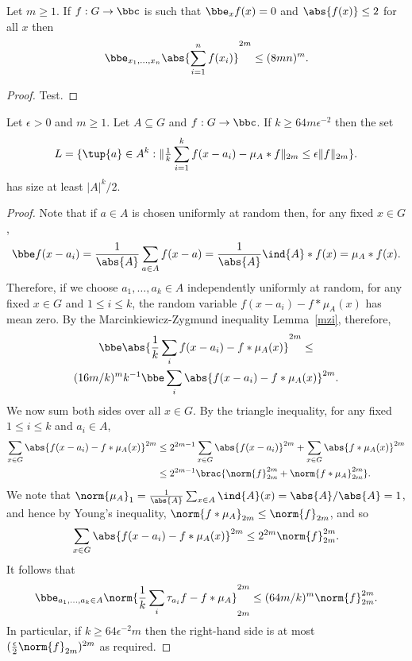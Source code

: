 \begin{lemma}
\label{mzi_complex}
\leanok
{}
Let $m\geq 1$. If $f:G\to\bbc$ is such that $\bbe_x f(x)=0$ and $\abs{f(x)}\leq 2$ for all $x$ then
\[\bbe_{x_1,\ldots,x_n} \abs{\sum_{i=1}^n f(x_i)}^{2m} \leq (8mn)^{m}.\]
\end{lemma}

\begin{proof}
\leanok
Test.
\end{proof}


\begin{lemma}
  \label{random_approx_expect}
  \leanok

  Let $\epsilon>0$ and $m\geq 1$. Let $A\subseteq G$ and $f:G\to \bbc$.
  If $k\geq 64m\epsilon^{-2}$ then the set
  \[
    L = \{\tup{a}\in A^k : \|\tfrac{1}{k}\sum_{i=1}^k f(x-a_i)-\mu_A\ast f\|_{2m}
      \le \epsilon \| f\|_{2m}\}.
  \]
  has size at least $\lvert A \rvert^k/2$.
\end{lemma}

\begin{proof}
\leanok
Note that if $a\in A$ is chosen uniformly at random then, for any fixed $x\in G$,
\[\bbe f(x-a_i)= \frac{1}{\abs{A}}\sum_{a\in A}f(x-a)=\frac{1}{\abs{A}}\ind{A}\ast f(x)=\mu_A\ast f(x).\]
Therefore, if we choose $a_1,\ldots,a_k\in A$ independently uniformly at random, for any fixed $x\in G$ and $1\leq i\leq k$,  the random variable $f(x-a_i)-f\ast \mu_A(x)$ has mean zero. By the Marcinkiewicz-Zygmund inequality Lemma~\ref{mzi}, therefore,
\begin{multline*}
\bbe\abs{ \frac{1}{k}\sum_i f(x-a_i)-f\ast \mu_A(x)}^{2m} \leq \\(16m/k)^mk^{-1} \bbe \sum_i \abs{f(x-a_i)-f\ast \mu_A(x)}^{2m}.
\end{multline*}
We now sum both sides over all $x\in G$. By the triangle inequality, for any fixed $1\leq i\leq k$ and $a_i\in A$,
\begin{align*}
\sum_{x\in G} \abs{f(x-a_i)-f\ast \mu_A(x)}^{2m}
&\leq 2^{2m-1}\sum_{x\in G}\abs{f(x-a_i)}^{2m}+\sum_{x\in G}\abs{f\ast \mu_A(x)}^{2m}\\
&\leq 2^{2m-1}\brac{\norm{f}_{2m}^{2m}+\norm{f\ast \mu_A}_{2m}^{2m}}.
\end{align*}
We note that $\norm{\mu_A}_1=\frac{1}{\abs{A}}\sum_{x\in A}\ind{A}(x)=\abs{A}/\abs{A}=1$, and hence by Young's inequality, $\norm{f\ast \mu_A}_{2m}\leq \norm{f}_{2m}$, and so
\[\sum_{x\in G} \abs{f(x-a_i)-f\ast \mu_A(x)}^{2m}\leq 2^{2m}\norm{f}_{2m}^{2m}.\]
It follows that
\[\bbe_{a_1,\ldots,a_k\in A}\norm{\frac{1}{k}\sum_i\tau_{a_i}f-f\ast \mu_A}_{2m}^{2m}\leq
(64m/k)^m\norm{f}_{2m}^{2m}.\]
In particular, if $k\geq 64\epsilon^{-2}m$ then the right-hand side is at most $(\frac{\epsilon}{2}\norm{f}_{2m})^{2m}$ as required.
\end{proof}


